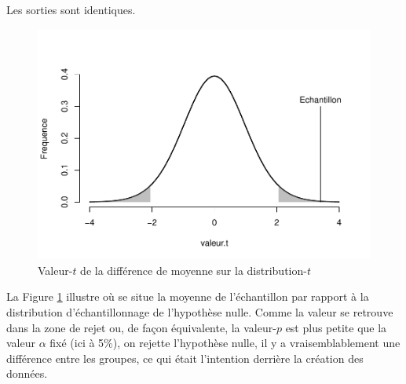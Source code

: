 \documentclass[
]{book}
\newenvironment{Shaded}{}{}
\newcommand{\CommentTok}[1]{\textit{#1}}
\newcommand{\FunctionTok}[1]{#1}
\newcommand{\NormalTok}[1]{#1}
\begin{document}
\begin{Shaded}
\end{Shaded}

Les sorties sont identiques.

\begin{figure}

{\centering \includegraphics[width=0.75\linewidth,height=0.75\textheight]{09-Analyser_files/figure-latex/disttt-1} 

}

\caption{Valeur-$t$ de la différence de moyenne sur la distribution-$t$}\label{fig:disttt}
\end{figure}

La Figure \ref{fig:disttt} illustre où se situe la moyenne de l'échantillon par rapport à la distribution d'échantillonnage de l'hypothèse nulle. Comme la valeur se retrouve dans la zone de rejet ou, de façon équivalente, la valeur-\(p\) est plus petite que la valeur \(\alpha\) fixé (ici à 5\%), on rejette l'hypothèse nulle, il y a vraisemblablement une différence entre les groupes, ce qui était l'intention derrière la création des données.
\end{document}
